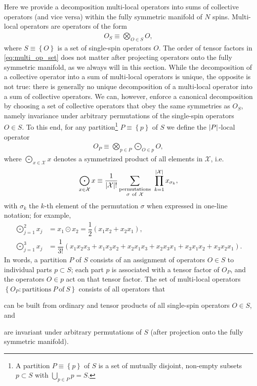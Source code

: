 \documentclass[nofootinbib,notitlepage,11pt]{revtex4-2}
\renewcommand{\t}{\text} %
\newcommand{\f}[2]{\dfrac{#1}{#2}} %
\newcommand{\p}[1]{\left(#1\right)} %
\renewcommand{\set}[1]{\left\{#1\right\}} %
\newcommand{\1}{\mathds{1}}
\newcommand{\X}{\mathcal{X}}
\begin{document}
Here we provide a decomposition multi-local operators into sums of
collective operators (and vice versa) within the fully symmetric
manifold of $N$ spins.  Multi-local operators are operators of the
form
\begin{align}
  O_S \equiv \bigotimes_{O\in S} O,
  \label{eq:multi_op_set}
\end{align}
where $S\equiv\set{O}$ is a set of single-spin operators $O$.  The
order of tensor factors in \eqref{eq:multi_op_set} does not matter
after projecting operators onto the fully symmetric manifold, as we
always will in this section.  While the decomposition of a collective
operator into a sum of multi-local operators is unique, the opposite
is not true: there is generally no unique decomposition of a
multi-local operator into a sum of collective operators.  We can,
however, enforce a canonical decomposition by choosing a set of
collective operators that obey the same symmetries as $O_S$, namely
invariance under arbitrary permutations of the single-spin operators
$O\in S$.  To this end, for any partition\footnote{A partition
  $P\equiv\set{p}$ of $S$ is a set of mutually disjoint, non-empty
  subsets $p\subset S$ with $\bigcup_{p\in P}p=S$.}  $P\equiv\set{p}$
of $S$ we define the $\abs{P}$-local operator
\begin{align}
  O_P \equiv \bigotimes_{p\in P} \bigodot_{O\in p} O,
\end{align}
where $\bigodot_{x\in\X} x$ denotes a symmetrized product of all
elements in $\X$, i.e.
\begin{align}
  \bigodot_{x\in\X} x
  \equiv \f1{\abs{\X}!}
  \sum_{\substack{\t{permutations}\\\sigma~\t{of}~\X}}
  ~ \prod_{k=1}^{\abs{\X}} x_{\sigma_k},
\end{align}
with $\sigma_k$ the $k$-th element of the permutation $\sigma$ when
expressed in one-line notation; for example,
\begin{align}
  \bigodot_{j=1}^2 x_j &= x_1 \odot x_2 = \f12 \p{x_1x_2 + x_2x_1}, \\
  \bigodot_{j=1}^3 x_j
  &= \f1{3!} \p{x_1x_2x_3 + x_1x_3x_2 + x_2x_1x_3
    + x_2x_3x_1 + x_3x_1x_2 + x_3x_2x_1}.
\end{align}
In words, a partition $P$ of $S$ consists of an assignment of
operators $O\in S$ to individual parts $p\subset S$; each part $p$ is
associated with a tensor factor of $O_P$, and the operators $O\in p$
act on that tensor factor.  The set of multi-local operators
$\set{O_P:\t{partitions}~P~\t{of}~S}$ consists of all operators that
\begin{enumerate*}
\item can be built from ordinary and tensor products of all
  single-spin operators $O\in S$, and
\item are invariant under arbitrary permutations of $S$ (after
  projection onto the fully symmetric manifold).
\end{enumerate*}
\end{document}
